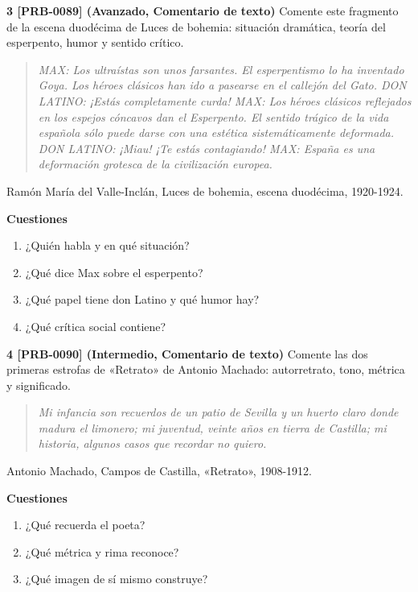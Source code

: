 \documentclass{book}
\begin{document}
\begin{tcolorbox}[title={Ejercicios}, studiumworked, breakable]
\noindent\textbf{3 [PRB-0089] (Avanzado, Comentario de texto)}
Comente este fragmento de la escena duodécima de Luces de bohemia: situación dramática, teoría del esperpento, humor y sentido crítico.


\begin{quote}
\itshape MAX: Los ultraístas son unos farsantes. El esperpentismo lo ha inventado Goya. Los héroes clásicos han ido a pasearse en el callejón del Gato. DON LATINO: ¡Estás completamente curda! MAX: Los héroes clásicos reflejados en los espejos cóncavos dan el Esperpento. El sentido trágico de la vida española sólo puede darse con una estética sistemáticamente deformada. DON LATINO: ¡Miau! ¡Te estás contagiando! MAX: España es una deformación grotesca de la civilización europea.
\end{quote}
{\noindent\footnotesize Ramón María del Valle-Inclán, Luces de bohemia, escena duodécima, 1920-1924.\par}

\noindent\textbf{Cuestiones}
\begin{enumerate}
\item ¿Quién habla y en qué situación?
\item ¿Qué dice Max sobre el esperpento?
\item ¿Qué papel tiene don Latino y qué humor hay?
\item ¿Qué crítica social contiene?
\end{enumerate}

\noindent\textbf{4 [PRB-0090] (Intermedio, Comentario de texto)}
Comente las dos primeras estrofas de «Retrato» de Antonio Machado: autorretrato, tono, métrica y significado.


\begin{quote}
\itshape Mi infancia son recuerdos de un patio de Sevilla y un huerto claro donde madura el limonero; mi juventud, veinte años en tierra de Castilla; mi historia, algunos casos que recordar no quiero.
\end{quote}
{\noindent\footnotesize Antonio Machado, Campos de Castilla, «Retrato», 1908-1912.\par}

\noindent\textbf{Cuestiones}
\begin{enumerate}
\item ¿Qué recuerda el poeta?
\item ¿Qué métrica y rima reconoce?
\item ¿Qué imagen de sí mismo construye?
\end{enumerate}


\end{tcolorbox}
\end{document}
